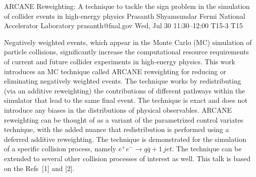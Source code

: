 \begin{talk}
  {ARCANE Reweighting: A technique to tackle the sign problem in the simulation of collider events in high-energy physics}%
  {Prasanth Shyamsundar}%
  {Fermi National Accelerator Laboratory}%
  {prasanth@fnal.gov}%
  {}%
  {}%
  {Wed, Jul 30 11:30--12:00}%
  {T15-3}%
  {T15}%
  {}%
  
    
   

Negatively weighted events, which appear in the Monte Carlo (MC) simulation of particle collisions, significantly increase the computational resource requirements of current and future collider experiments in high-energy physics. This work introduces an MC technique called ARCANE reweighting for reducing or eliminating negatively weighted events. The technique works by redistributing (via an additive reweighting) the contributions of different pathways within the simulator that lead to the same final event. The technique is exact and does not introduce any biases in the distributions of physical observables. ARCANE reweighting can be thought of as a variant of the parametrized control variates technique, with the added nuance that redistribution is performed using a deferred additive reweighting. The technique is demonstrated for the simulation of a specific collision process, namely $e^+ e^- \longrightarrow q \bar{q} + 1\,jet$. The technique can be extended to several other collision processes of interest as well. This talk is based on the Refs~[1] and [2].

\medskip


\end{talk}
